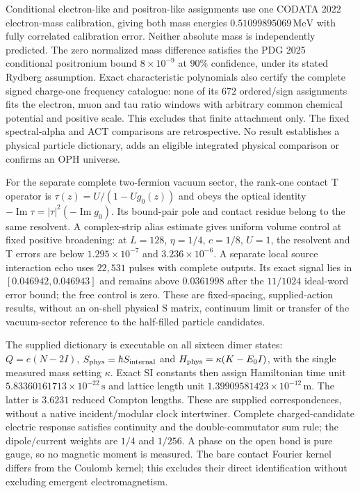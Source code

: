 Conditional electron-like and positron-like assignments use one CODATA
2022 electron-mass calibration, giving both mass energies
$0.51099895069\,\mathrm{MeV}$ with fully correlated calibration error.
Neither absolute mass is independently predicted. The zero normalized
mass difference satisfies the PDG 2025 conditional positronium bound
$8\times10^{-9}$ at $90\%$ confidence, under its stated Rydberg assumption.
Exact characteristic polynomials also certify the complete signed
charge-one frequency catalogue: none of its $672$ ordered/sign assignments
fits the electron, muon and tau ratio windows with arbitrary common
chemical potential and positive scale. This excludes that finite
attachment only. The fixed spectral-alpha and ACT comparisons are
retrospective. No result establishes a physical particle dictionary,
adds an eligible integrated physical comparison or confirms an OPH universe.

For the separate complete two-fermion vacuum sector, the rank-one contact
T operator is $\tau(z)=U/(1-Ug_0(z))$ and obeys the optical identity
$-\operatorname{Im}\tau=|\tau|^2(-\operatorname{Im}g_0)$.
Its bound-pair pole and contact residue belong to the same resolvent.
A complex-strip alias estimate gives uniform volume control at fixed
positive broadening: at $L=128$, $\eta=1/4$, $c=1/8$, $U=1$, the
resolvent and T errors are below $1.295\times10^{-7}$ and
$3.236\times10^{-6}$. A separate local source interaction echo uses
$22{,}531$ pulses with complete outputs. Its exact signal lies in
$[0.046942,0.046943]$ and remains above $0.0361998$ after the
$11/1024$ ideal-word error bound; the free control is zero.
These are fixed-spacing, supplied-action results, without an on-shell
physical S matrix, continuum limit or transfer of the vacuum-sector
reference to the half-filled particle candidates.


The supplied dictionary is executable on all sixteen dimer states:
$Q=e(N-2I)$, $S_{\rm phys}=\hbar S_{\rm internal}$ and
$H_{\rm phys}=\kappa(K-E_0I)$, with the single measured mass setting
$\kappa$. Exact SI constants then assign Hamiltonian time unit
$5.83360161713\times10^{-22}\,\mathrm{s}$ and lattice length unit
$1.39909581423\times10^{-12}\,\mathrm{m}$. The latter is $3.6231$
reduced Compton lengths. These are supplied correspondences, without a
native incident/modular clock intertwiner. Complete charged-candidate
electric response satisfies continuity and the double-commutator sum rule;
the dipole/current weights are $1/4$ and $1/256$. A phase on the open bond
is pure gauge, so no magnetic moment is measured. The bare contact Fourier
kernel differs from the Coulomb kernel; this excludes their direct
identification without excluding emergent electromagnetism.

